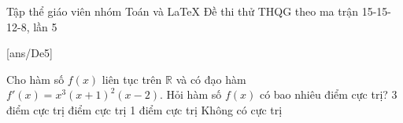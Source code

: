 \begin{name}
	{Tập thể giáo viên nhóm Toán và \LaTeX}
	{Đề thi thử THQG theo ma trận 15-15-12-8, lần 5}
\end{name}
\setcounter{ex}{0}

[ans/De5]
\begin{ex}%
Cho hàm số $f(x)$ liên tục trên $\mathbb{R}$ và có đạo hàm $f'(x)=x^3\left(x+1\right)^2\left(x-2\right)$. Hỏi hàm số $f(x)$ có bao nhiêu điểm cực trị?
\choice
{3 điểm cực trị}
{ điểm cực trị}
{1 điểm cực trị} 
{Không có cực trị} 
\end{ex}

